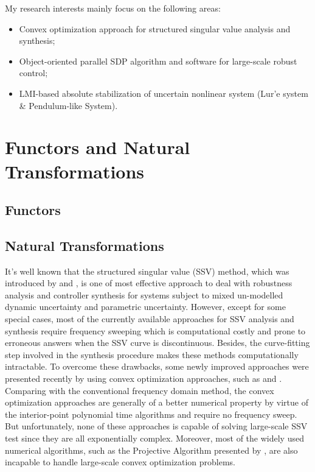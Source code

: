 \documentclass{article}
\begin{document}
My research interests mainly focus on the following areas:
\begin{itemize}
\item
Convex optimization approach for structured singular value analysis and synthesis;
\item
Object-oriented parallel SDP algorithm and software for large-scale robust control;
\item
LMI-based absolute stabilization of uncertain nonlinear system (Lur'e system \& Pendulum-like System).
\end{itemize}

\section{Functors and Natural Transformations}
\subsection{Functors}

\subsection{Natural Transformations}
It's well known that the structured singular value (SSV) method,
which was introduced by {\citet{PBC91}} and {\citet{AS10}},
is one of most effective approach to deal with robustness analysis and controller synthesis for systems
subject to mixed un-modelled dynamic uncertainty and parametric uncertainty.
However, except for some special cases, most of the currently available approaches for SSV analysis and synthesis require
frequency sweeping which is computational costly and prone to erroneous answers
when the SSV curve is discontinuous.
Besides, the curve-fitting step involved in the synthesis procedure makes these methods computationally intractable.
To overcome these drawbacks, some newly improved approaches were presented recently by using convex optimization approaches,
such as {\citep{BirddeMoor96:Algebra}} and {\citep{AV12}}.
Comparing with the conventional frequency domain method,
the convex optimization approaches are generally of a better numerical property
by virtue of the interior-point polynomial time algorithms{\citep{AM75}} and require no frequency sweep.
But unfortunately, none of these approaches is capable of solving large-scale SSV test
since they are all exponentially complex.
Moreover, most of the widely used numerical algorithms,
such as the Projective Algorithm presented by {\citet{MLS98}},
are also incapable to handle large-scale convex optimization problems.
\end{document}

